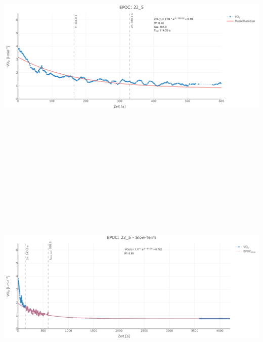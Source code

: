 \documentclass[
  letterpaper,
  DIV=11]{scrartcl}
\begin{document}
\includegraphics[width=11.45833in,height=4.6875in]{images/22_5_tau.png}
\includegraphics[width=11.45833in,height=4.6875in]{images/22_5_slow.png}
\end{document}

